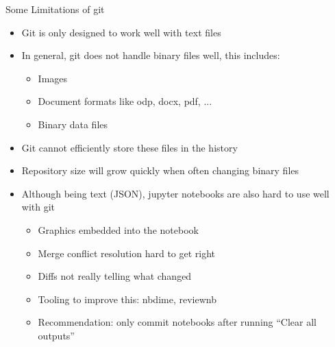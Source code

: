 \begin{frame}[c]{Some Limitations of git}
  \begin{itemize}
    \item Git is only designed to work well with text files
    \item In general, git does not handle binary files well, this includes:
      \begin{itemize}
        \item Images
        \item Document formats like odp, docx, pdf, ...
        \item Binary data files
      \end{itemize}
    \item Git cannot efficiently store these files in the history
    \item Repository size will grow quickly when often changing binary files
    \item Although being text (JSON), jupyter notebooks are also hard to use well with git
      \begin{itemize}
        \item Graphics embedded into the notebook
        \item Merge conflict resolution hard to get right
        \item Diffs not really telling what changed
        \item Tooling to improve this: nbdime, reviewnb
        \item Recommendation: only commit notebooks after running \enquote{Clear all outputs}
      \end{itemize}
  \end{itemize}  
\end{frame}

